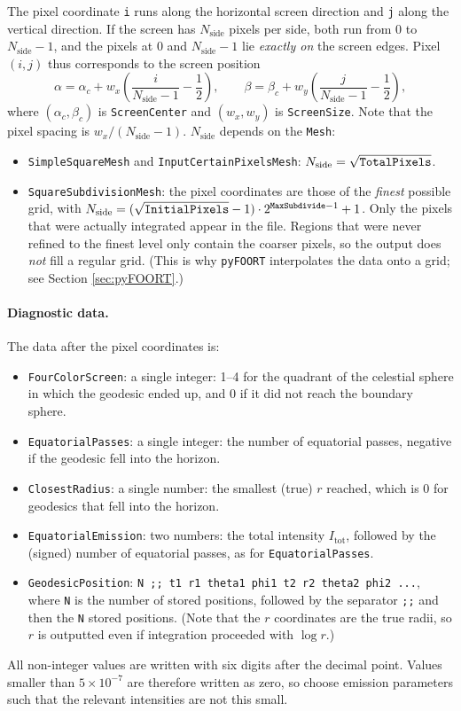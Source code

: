\documentclass[11pt,a4paper]{article}
\newcommand{\be}{\begin{equation}}
\newcommand{\ee}{\end{equation}}
\newcommand{\code}[1]{{\tt #1}}
\begin{document}
The pixel coordinate \code{i} runs along the horizontal screen direction and \code{j} along the vertical direction. If the screen has $N_\text{side}$ pixels per side, both run from $0$ to $N_\text{side}-1$, and the pixels at $0$ and $N_\text{side}-1$ lie \emph{exactly on} the screen edges. Pixel $(i,j)$ thus corresponds to the screen position
\be \alpha = \alpha_c + w_x\left(\frac{i}{N_\text{side}-1}-\frac12\right),\qquad \beta = \beta_c + w_y\left(\frac{j}{N_\text{side}-1}-\frac12\right), \ee
where $(\alpha_c,\beta_c)$ is \code{ScreenCenter} and $(w_x,w_y)$ is \code{ScreenSize}. Note that the pixel spacing is $w_x/(N_\text{side}-1)$. $N_\text{side}$ depends on the \code{Mesh}:
\begin{itemize}
 \item \code{SimpleSquareMesh} and \code{InputCertainPixelsMesh}: $N_\text{side} = \sqrt{\code{TotalPixels}}$.
 \item \code{SquareSubdivisionMesh}: the pixel coordinates are those of the \emph{finest} possible grid, with $N_\text{side} = (\sqrt{\code{InitialPixels}}-1)\cdot 2^{\code{MaxSubdivide}-1}+1$. Only the pixels that were actually integrated appear in the file. Regions that were never refined to the finest level only contain the coarser pixels, so the output does \emph{not} fill a regular grid. (This is why \code{pyFOORT} interpolates the data onto a grid; see Section \ref{sec:pyFOORT}.)
\end{itemize}

\paragraph{Diagnostic data.} The data after the pixel coordinates is:
\begin{itemize}
 \item \code{FourColorScreen}: a single integer: 1--4 for the quadrant of the celestial sphere in which the geodesic ended up, and 0 if it did not reach the boundary sphere.
 \item \code{EquatorialPasses}: a single integer: the number of equatorial passes, negative if the geodesic fell into the horizon.
 \item \code{ClosestRadius}: a single number: the smallest (true) $r$ reached, which is 0 for geodesics that fell into the horizon.
 \item \code{EquatorialEmission}: two numbers: the total intensity $I_\text{tot}$, followed by the (signed) number of equatorial passes, as for \code{EquatorialPasses}.
 \item \code{GeodesicPosition}: \code{N ;; t1 r1 theta1 phi1 t2 r2 theta2 phi2 ...}, where \code{N} is the number of stored positions, followed by the separator \code{;;} and then the \code{N} stored positions. (Note that the $r$ coordinates are the true radii, so $r$ is outputted even if integration proceeded with $\log r$.)
\end{itemize}
 All non-integer values are written with six digits after the decimal point. Values smaller than $5\times 10^{-7}$ are therefore written as zero, so choose emission parameters such that the relevant intensities are not this small.
\end{document}

